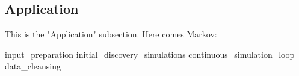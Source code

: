 \subsection{Application}

This is the "Application" subsection. Here comes Markov:

{input_preparation}
{initial_discovery_simulations}
{continuous_simulation_loop}
{data_cleansing}
